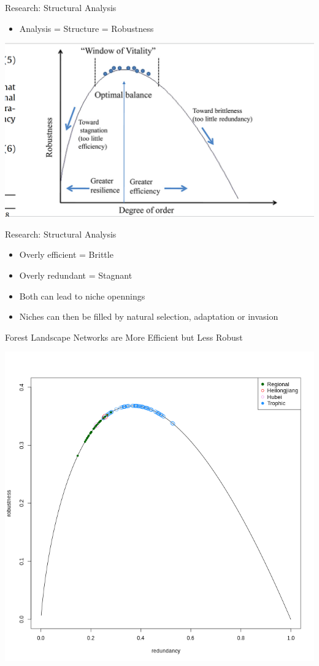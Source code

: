 \documentclass[ignorenonframetext,]{beamer}
\providecommand{\tightlist}{%
  \setlength{\itemsep}{0pt}\setlength{\parskip}{0pt}}
\begin{document}
\begin{frame}{Research: Structural Analysis}
\protect\hypertarget{research-structural-analysis}{}

\begin{itemize}
\tightlist
\item
  Analysis = Structure = Robustness
\end{itemize}

\begin{center}\includegraphics[width=0.5\linewidth]{images/Fath_2015_Fig6} \end{center}

\end{frame}

\begin{frame}{Research: Structural Analysis}
\protect\hypertarget{research-structural-analysis-1}{}

\begin{itemize}
\tightlist
\item
  Overly efficient = Brittle
\item
  Overly redundant = Stagnant
\item
  Both can lead to niche opennings
\item
  Niches can then be filled by natural selection, adaptation or invasion
\end{itemize}

\end{frame}

\begin{frame}{Forest Landscape Networks are More Efficient but Less
Robust}
\protect\hypertarget{forest-landscape-networks-are-more-efficient-but-less-robust}{}

\begin{center}\includegraphics[width=0.5\linewidth]{images/for-rob-red} \end{center}

\end{frame}
\end{document}
